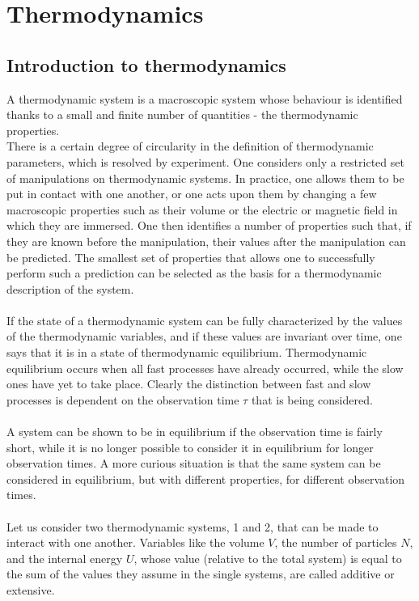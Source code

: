 \documentclass[cyan]{elegantnote}
\author{Yuyang Songsheng}
\begin{document}
\maketitle
\tableofcontents

\chapter{Thermodynamics}
\section{Introduction to thermodynamics}
A thermodynamic system is a macroscopic system whose behaviour is identified thanks to a small and finite number of quantities - the thermodynamic properties.
\\
There is a certain degree of circularity in the definition of thermodynamic parameters, which is resolved by experiment. One considers only a restricted set of manipulations on thermodynamic systems. In practice, one allows them to be put in contact with one another, or one acts upon them by changing a few macroscopic properties such as their volume or the electric or magnetic field in which they are immersed. One then identifies a number of properties such that, if they are known before the manipulation, their values after the manipulation can be predicted. The smallest set of properties that allows one to successfully perform such a prediction can be selected as the basis for a thermodynamic description of the system.
\\ \\
If the state of a thermodynamic system can be fully characterized by the values of the thermodynamic variables, and if these values are invariant over time, one says that it is in a state of thermodynamic equilibrium. Thermodynamic equilibrium occurs when all fast processes have already occurred, while the slow ones have yet to take place. Clearly the distinction between fast and slow processes is dependent on the observation time $\tau$ that is being considered.
\\ \\
A system can be shown to be in equilibrium if the observation time is fairly short, while it is no longer possible to consider it in equilibrium for longer observation times. A more curious situation is that the same system can be considered in equilibrium, but with different properties, for different observation times.
\\ \\
Let us consider two thermodynamic systems, 1 and 2, that can be made to interact with one another. Variables like the volume $V$, the number of particles $N$, and the internal energy $U$, whose value (relative to the total system) is equal to the sum of the values they assume in the single systems, are called additive or extensive.
\end{document}
